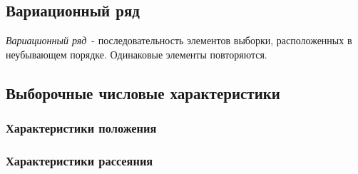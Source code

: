 \subsection{Вариационный ряд}
\textit{Вариационный ряд}\ - последовательность элементов выборки, расположенных в неубывающем порядке. Одинаковые элементы повторяются.

\subsection{Выборочные числовые характеристики}
\subsubsection{Характеристики положения}
\subsubsection{Характеристики рассеяния}